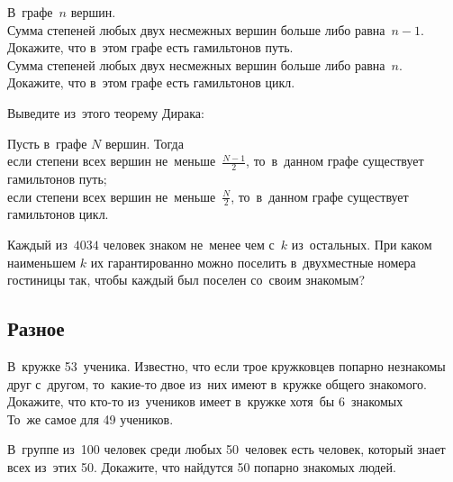\begin{problems}

\item{}
В~графе~$n$ вершин.
\\
\subproblem
Сумма степеней любых двух несмежных вершин больше либо равна~$n - 1$.
Докажите, что в~этом графе есть гамильтонов путь.
\\
\subproblem
Сумма степеней любых двух несмежных вершин больше либо равна~$n$.
Докажите, что в~этом графе есть гамильтонов цикл.

Выведите из~этого теорему Дирака:

\resetsubproblem
{}
Пусть в~графе $N$ вершин.
Тогда
\\
\subproblem
если степени всех вершин не~меньше~$\frac{N - 1}{2}$, то~в~данном графе
существует гамильтонов путь;
\\
\subproblem
если степени всех вершин не~меньше~$\frac{N}{2}$, то~в~данном графе существует
гамильтонов цикл.

\item
Каждый из~$4034$ человек знаком не~менее чем с~$k$ из~остальных.
При каком наименьшем $k$ их гарантированно можно поселить в~двухместные номера
гостиницы так, чтобы каждый был поселен со~своим знакомым?

\end{problems}


\subsection*{Разное}

\begin{problems}

\item
\subproblem
В~кружке 53~ученика.
Известно, что если трое кружковцев попарно незнакомы друг с~другом, то~какие-то
двое из~них имеют в~кружке общего знакомого.
Докажите, что кто-то из~учеников имеет в~кружке хотя~бы 6~знакомых
\\
\subproblem
То~же самое для 49 учеников.

\item
В~группе из~100 человек среди любых 50~человек есть человек, который знает
всех из~этих 50.
Докажите, что найдутся 50 попарно знакомых людей.

\end{problems}

